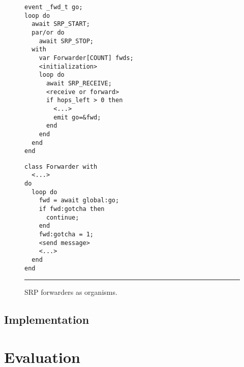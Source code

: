 \documentclass[10pt]{sensys-proc}
\begin{document}
\begin{figure}[t]
\begin{minipage}[t]{0.45\linewidth}
{\small
\begin{verbatim}
event _fwd_t go;
loop do
  await SRP_START;
  par/or do
    await SRP_STOP;
  with
    var Forwarder[COUNT] fwds;
    <initialization>
    loop do
      await SRP_RECEIVE;
      <receive or forward>
      if hops_left > 0 then
        <...>
        emit go=&fwd;
      end
    end
  end
end
\end{verbatim}
}
\end{minipage}
%
\hspace{0.0cm}
%
\begin{minipage}[t]{0.45\linewidth}
{\small
\begin{verbatim}
class Forwarder with
  <...>
do
  loop do
    fwd = await global:go;
    if fwd:gotcha then
      continue;
    end
    fwd:gotcha = 1;
    <send message>
    <...>
  end
end
\end{verbatim}
}
\end{minipage}
\rule{8.5cm}{0.37pt}
\caption{ SRP forwarders as organisms.
\label{lst.srp}
}
\end{figure}

\begin{comment}
Objects
    - each method is a global function receiving a different object to 
      manipulate
    - global (usually heap)
    - garbage collected or global

Organisms
    - mutual reactivity
    - scoped / local
    - O(1) GC

- nesting
    - data
    - events
    - listeners
    - compositions

- both have an interface
- fields / methods

- fields / internal events
- public fields are ok because reliable shared memory

- no recursive definitions
- but we have interfaces
- special global interface
\end{comment}

\subsection{Implementation}

\section{Evaluation}
\label{sec.eval}
\end{document}
